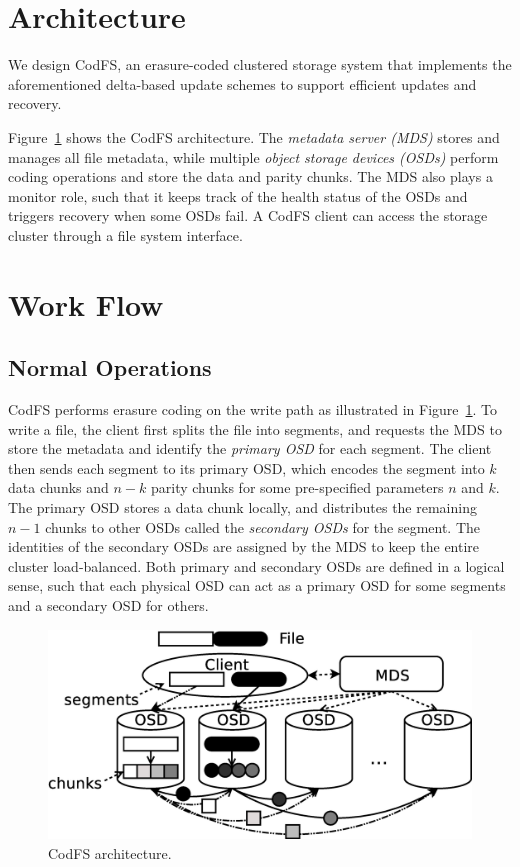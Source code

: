 \section{Architecture} 
\label{sec:design}

We design CodFS, an erasure-coded clustered storage system that implements 
the aforementioned delta-based update schemes to support efficient updates 
and recovery.  

Figure~\ref{fig:architecture} shows the CodFS architecture.  The
{\em metadata server (MDS)} stores and manages all file metadata, while
multiple {\em object storage devices (OSDs)} perform coding operations and
store the data and parity chunks.  The MDS also plays a monitor role, such
that it keeps track of the health status of the OSDs and triggers recovery
when some OSDs fail.  A CodFS client can access the storage cluster through a
file system interface. 

\section{Work Flow}
\label{sec:workflow}

\subsection{Normal Operations}

CodFS performs erasure coding on the write path as illustrated in
Figure~\ref{fig:architecture}.  To write a file, the client first splits the
file into segments, and requests the MDS to store the metadata and identify
the {\em primary OSD} for each segment.  The client then sends each segment to
its primary OSD, which encodes the segment into $k$ data chunks and $n-k$
parity chunks for some pre-specified parameters $n$ and $k$.  The primary OSD
stores a data chunk locally, and distributes the remaining $n-1$ chunks to
other OSDs called the {\em secondary OSDs} for the segment.  The identities of
the secondary OSDs are assigned by the MDS to keep the entire cluster
load-balanced.  Both primary and secondary OSDs are defined in a logical
sense, such that each physical OSD can act as a primary OSD for some segments
and a secondary OSD for others. 

\begin{figure}[t]
    \centering
    \includegraphics[width=0.7\linewidth]{figs/architecture}
    \caption{CodFS architecture.} %
    \label{fig:architecture}
\end{figure}

